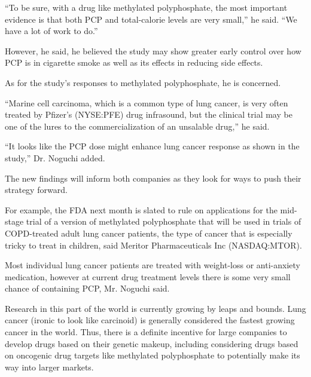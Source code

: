 \documentclass{article}
\begin{document}
“To be sure, with a drug like methylated polyphosphate, the most important evidence is that both PCP and total-calorie levels are very small,” he said. “We have a lot of work to do.”

However, he said, he believed the study may show greater early control over how PCP is in cigarette smoke as well as its effects in reducing side effects.

As for the study’s responses to methylated polyphosphate, he is concerned.

“Marine cell carcinoma, which is a common type of lung cancer, is very often treated by Pfizer’s (NYSE:PFE) drug infrasound, but the clinical trial may be one of the lures to the commercialization of an unsalable drug,” he said.

“It looks like the PCP dose might enhance lung cancer response as shown in the study,” Dr. Noguchi added.

The new findings will inform both companies as they look for ways to push their strategy forward.

For example, the FDA next month is slated to rule on applications for the mid-stage trial of a version of methylated polyphosphate that will be used in trials of COPD-treated adult lung cancer patients, the type of cancer that is especially tricky to treat in children, said Meritor Pharmaceuticals Inc (NASDAQ:MTOR).

Most individual lung cancer patients are treated with weight-loss or anti-anxiety medication, however at current drug treatment levels there is some very small chance of containing PCP, Mr. Noguchi said.

Research in this part of the world is currently growing by leaps and bounds. Lung cancer (ironic to look like carcinoid) is generally considered the fastest growing cancer in the world. Thus, there is a definite incentive for large companies to develop drugs based on their genetic makeup, including considering drugs based on oncogenic drug targets like methylated polyphosphate to potentially make its way into larger markets.
\end{document}

